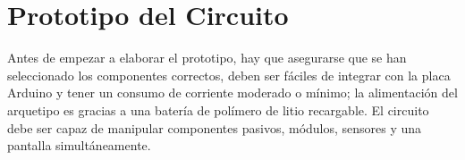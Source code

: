 \section{Prototipo del Circuito}
\par 
Antes de empezar a elaborar el prototipo, hay que asegurarse que se han seleccionado los componentes correctos, deben ser fáciles de integrar con la placa Arduino y tener un consumo de corriente moderado o mínimo; la alimentación del arquetipo es gracias a una batería de polímero de litio recargable. El circuito debe ser capaz de manipular componentes pasivos, módulos, sensores y una pantalla simultáneamente.




